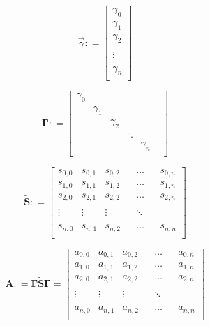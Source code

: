 \documentclass{book}
\begin{document}
\begin{equation} \vec{\gamma}: =
    \begin{bmatrix}
        \gamma_{0}\\
        \gamma_{1}\\
        \gamma_{2}\\
        {}\\
        \vdots\\
        {}\\
        \gamma_{n}\\
    \end{bmatrix}
    \label{gamma}
    \end{equation}


\begin{equation} \mathbf{\Gamma}: =
    \begin{bmatrix}
        \gamma_{0}&{}&{}&{}&{}\\
        {}&\gamma_{1}&{}&{}&{}&\\
        {}&{}&\gamma_{2}&{}&{}&\\
        {}&{}&{}&\ddots&{}&\\
        {}&{}&{}&{}&\gamma_{n}\\
    \end{bmatrix}
    \label{vertex_weights}
    \end{equation}

\begin{equation} \mathbf{\tilde{S}}: =
    \begin{bmatrix}
    s_{0,0}&  s_{0,1}&  s_{0,2}& {}& \dots& {}& s_{0, n}\\
    s_{1,0}&  s_{1,1}&  s_{1,2}& {}& \dots& {}& s_{1, n}\\
    s_{2,0}&  s_{2,1}&  s_{2,2}& {}& \dots& {}& s_{2, n}\\
    {}&{}&{}&{}&{}&{}\\
    \vdots& \vdots&  \vdots& {}&\ddots & {}&{}\\
    {}&{}&{}&{}&{}&{}\\
    s_{n,0}&  s_{n,1}&  s_{n,2}& {}& \dots& {}& s_{n, n}\\
    \end{bmatrix}
    \label{similarity}
\end{equation}


\begin{equation} \mathbf{A}: = \mathbf{\Gamma \tilde{S} \Gamma} = 
    \begin{bmatrix}
    a_{0,0}&  a_{0,1}&  a_{0,2}& {}& \dots& {}& a_{0, n}\\
    a_{1,0}&  a_{1,1}&  a_{1,2}& {}& \dots& {}& a_{1, n}\\
    a_{2,0}&  a_{2,1}&  a_{2,2}& {}& \dots& {}& a_{2, n}\\
    {}&{}&{}&{}&{}&{}\\
    \vdots& \vdots&  \vdots& {}&\ddots & {}&{}\\
    {}&{}&{}&{}&{}&{}\\
    a_{n,0}&  a_{n,1}&  a_{n,2}& {}& \dots& {}& a_{n, n}\\
    \end{bmatrix}
    \label{affinity}
\end{equation}
\end{document}
